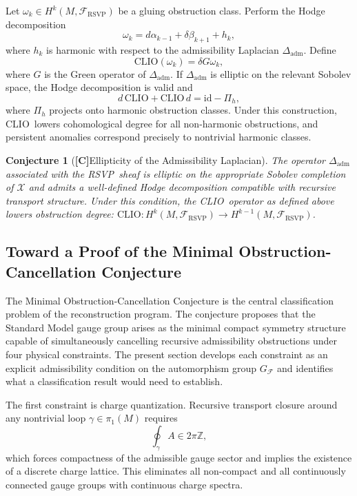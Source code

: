 \documentclass[12pt,a4paper]{article}
\newcommand{\claimC}{\textbf{[C]}\;}
\newtheorem{appconj}[defn]{Conjecture}
\newcommand{\RSVP}{\textrm{RSVP}}
\newcommand{\CLIO}{\textrm{CLIO}}
\newcommand{\Field}{\mathcal{X}}
\newcommand{\Sheaf}{\mathcal{F}}
\begin{document}
Let $\omega_k\in H^k(M,\Sheaf_\RSVP)$ be a gluing obstruction class. Perform
the Hodge decomposition
\[
\omega_k = d\alpha_{k-1} + \delta\beta_{k+1} + h_k,
\]
where $h_k$ is harmonic with respect to the admissibility Laplacian
$\Delta_\mathrm{adm}$. Define
\[
\CLIO(\omega_k) = \delta G\omega_k,
\]
where $G$ is the Green operator of $\Delta_\mathrm{adm}$. If $\Delta_\mathrm{adm}$
is elliptic on the relevant Sobolev space, the Hodge decomposition is valid and
\[
d\,\CLIO + \CLIO\,d = \mathrm{id} - \Pi_h,
\]
where $\Pi_h$ projects onto harmonic obstruction classes. Under this
construction, \CLIO\ lowers cohomological degree for all non-harmonic
obstructions, and persistent anomalies correspond precisely to nontrivial
harmonic classes.

\begin{appconj}[\claimC Ellipticity of the Admissibility Laplacian]
The operator $\Delta_\mathrm{adm}$ associated with the \RSVP\ sheaf is
elliptic on the appropriate Sobolev completion of $\Field$ and admits a
well-defined Hodge decomposition compatible with recursive transport structure.
Under this condition, the \CLIO\ operator as defined above lowers obstruction
degree: $\CLIO: H^k(M,\Sheaf_\RSVP)\to H^{k-1}(M,\Sheaf_\RSVP)$.
\end{appconj}

\subsection{Toward a Proof of the Minimal Obstruction-Cancellation Conjecture}

The Minimal Obstruction-Cancellation Conjecture is the central classification
problem of the reconstruction program. The conjecture proposes that the Standard
Model gauge group arises as the minimal compact symmetry structure capable of
simultaneously cancelling recursive admissibility obstructions under four
physical constraints. The present section develops each constraint as an
explicit admissibility condition on the automorphism group $G_\mathcal{F}$ and
identifies what a classification result would need to establish.

The first constraint is charge quantization. Recursive transport closure around
any nontrivial loop $\gamma\in\pi_1(M)$ requires
\[
\oint_\gamma A \in 2\pi\mathbb{Z},
\]
which forces compactness of the admissible gauge sector and implies the existence
of a discrete charge lattice. This eliminates all non-compact and all
continuously connected gauge groups with continuous charge spectra.
\end{document}
